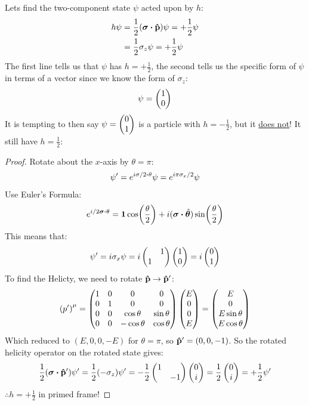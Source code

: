 Lets find the two-component state $\psi$ acted upon by $h$:
\begin{align*}
  h\psi&=\frac12(\bm{\sigma}\vdot\vu{p})\psi=+\frac12\psi\\
  &=\frac12\sigma_z\psi=+\frac12\psi
\end{align*}
The first line tells us that $\psi$ has $h=+\frac12$, the second tells us the specific form of $\psi$ in terms of a vector since we know the form of $\sigma_z$:
\begin{align*}
  \psi=\pmqty{1\\0}
\end{align*}
It is tempting to then say $\psi=\pmqty{0\\1}$ is a particle with $h=-\frac12$, but it \underline{does not}! It still have $h=\frac12$:
\begin{proof}
  Rotate about the $x$-axis by $\theta=\pi$:
  \begin{align*}
    \psi'=e^{i\sigma/2\vdot\theta}\psi=e^{i\pi\sigma_x/2}\psi
  \end{align*}
  Use Euler's Formula:
  \begin{align*}
    e^{i/2\bm{\sigma}\vdot\theta}=\bm{1}\cos(\frac\theta2)+
    i(\bm{\sigma}\vdot\hat{\bm{\theta}})\sin(\frac\theta2)
  \end{align*}
  This means that:
  \begin{align*}
    \psi'=i\sigma_x\psi=i\pmqty{&1\\1}\pmqty{1\\0}=i\pmqty{0\\1}
  \end{align*}
  To find the Helicty, we need to rotate $\vu{p}\to\vu{p}'$:
  \begin{align*}
    {(p')}^\mu=\pmqty{
      1&0&0&0\\
      0&1&0&0\\
      0&0&\cos\theta&\sin\theta\\
      0&0&-\cos\theta&\cos\theta
    }
    \pmqty{E\\0\\0\\E}=\pmqty{E\\0\\E\sin\theta\\E\cos\theta}
  \end{align*}
  Which reduced to $(E,0,0,-E)$ for $\theta=\pi$, so $\vu{p}'=(0,0,-1)$. So the rotated helicity operator on the rotated state gives:
  \begin{align*}
    \frac12(\bm{\sigma}\vdot\vu{p}')\psi'=\frac12(-\sigma_z)\psi'
    =-\frac12\pmqty{1\\&-1}\pmqty{0\\i}=\frac12\pmqty{0\\i}=+\frac12\psi'
  \end{align*}
  $\therefore h=+\frac12$ in primed frame!
\end{proof}

